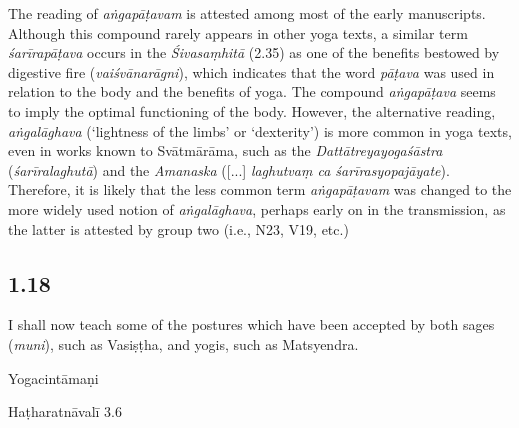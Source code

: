 \begin{ekdosis}
\begin{testimonia}[hp01_017]
\end{testimonia}

\begin{philcomm}[hp01_017]        
The reading of \emph{aṅgapāṭavam} is attested among most of the early manuscripts. Although this compound rarely appears in other yoga texts, a similar term \emph{śarīrapāṭava} occurs in the \emph{Śivasaṃhitā} (2.35) as one of the benefits bestowed by digestive fire (\emph{vaiśvānarāgni}), which indicates that the word \emph{pāṭava} was used in relation to the body and the benefits of yoga. The compound \emph{aṅgapāṭava} seems to imply the optimal functioning of the body. However, the alternative reading, \emph{aṅgalāghava} (‘lightness of the limbs’ or ‘dexterity’) is more common in yoga texts, even in works known to Svātmārāma, such as the \emph{Dattātreyayogaśāstra} (\emph{śarīralaghutā}) and the \textit{Amanaska} ([...] \emph{laghutvaṃ ca śarīrasyopajāyate}). Therefore, it is likely that the less common term \emph{aṅgapāṭavam} was changed to the more widely used notion of \emph{aṅgalāghava}, perhaps early on in the transmission, as the latter is attested by group two (i.e., N23, V19, etc.) 
\end{philcomm}

\subsection*{1.18}
\begin{translation}[hp01_018]
I shall now teach some of the postures which have been accepted by both sages (\emph{muni}), such as Vasiṣṭha, and yogis, such as Matsyendra.
\end{translation}

\begin{testimonia}[hp01_018]
Yogacintāmaṇi

\begin{versinnote}
\end{versinnote}

Haṭharatnāvalī 3.6

\begin{versinnote}
\end{versinnote}


\end{testimonia}
\end{ekdosis}
